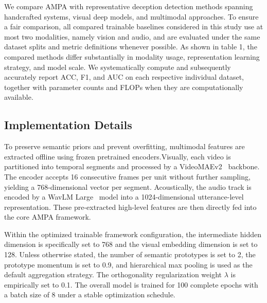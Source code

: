 \documentclass[sigconf,screen,review,anonymous]{acmart}
\begin{document}
We compare AMPA with representative deception detection methods spanning handcrafted systems, visual deep models, and multimodal approaches. To ensure a fair comparison, all compared trainable baselines considered in this study use at most two modalities, namely vision and audio, and are evaluated under the same dataset splits and metric definitions whenever possible. As shown in table 1, the compared methods differ substantially in modality usage, representation learning strategy, and model scale. We systematically compute and subsequently accurately report ACC, F1, and AUC on each respective individual dataset, together with parameter counts and FLOPs when they are computationally available.

\subsection{Implementation Details}

To preserve semantic priors and prevent overfitting, multimodal features are extracted offline using frozen pretrained encoders.Visually, each video is partitioned into temporal segments and processed by a VideoMAEv2~\cite{wang2023videomae} backbone. The encoder accepts 16 consecutive frames per unit without further sampling, yielding a 768-dimensional vector per segment. Acoustically, the audio track is encoded by a WavLM Large~\cite{chen2022wavlm} model into a 1024-dimensional utterance-level representation. These pre-extracted high-level features are then directly fed into the core AMPA framework.

Within the optimized trainable framework configuration, the intermediate hidden dimension is specifically set to 768 and the visual embedding dimension is set to 128. Unless otherwise stated, the number of semantic prototypes is set to 2, the prototype momentum is set to 0.9, and hierarchical max pooling is used as the default aggregation strategy. The orthogonality regularization weight $\lambda$ is empirically set to 0.1. The overall model is trained for 100 complete epochs with a batch size of 8 under a stable optimization schedule.
\end{document}
